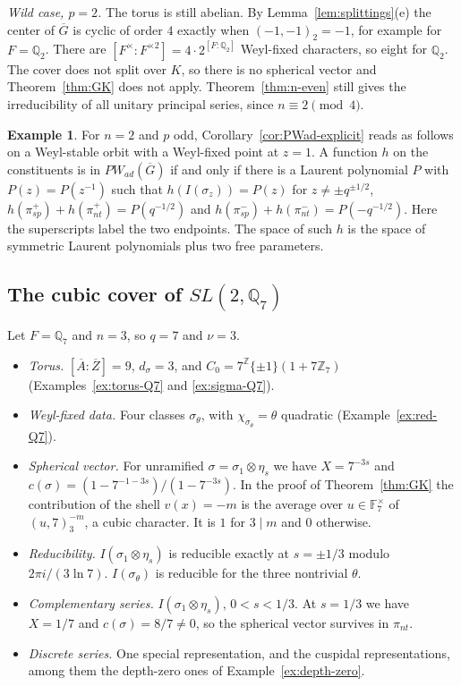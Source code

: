 \documentclass[12pt,letterpaper]{article}
\numberwithin{equation}{section}
\theoremstyle{definition}
\newtheorem{example}[theorem]{Example}
\newcommand{\Z}{\mathbb Z}
\newcommand{\Q}{\mathbb Q}
\newcommand{\bG}{\overline{G}}
\newcommand{\bA}{\overline{A}}
\newcommand{\bZ}{\overline{Z}}
\begin{document}
\emph{Wild case, $p=2$.}  The torus is still abelian.  By Lemma~\ref{lem:splittings}(e) the
center of $\bG$ is cyclic of order $4$ exactly when $(-1,-1)_2=-1$, for example for
$F=\Q_2$.  There are $[F^\times:F^{\times2}]=4\cdot2^{[F:\Q_2]}$ Weyl-fixed characters, so
eight for $\Q_2$.  The cover does not split over $K$, so there is no spherical vector and
Theorem~\ref{thm:GK} does not apply.  Theorem~\ref{thm:n-even} still gives the
irreducibility of all unitary principal series, since $n\equiv2\pmod4$.

\begin{example}\label{ex:PW-n2}
For $n=2$ and $p$ odd, Corollary~\ref{cor:PWad-explicit} reads as follows on a Weyl-stable
orbit with a Weyl-fixed point at $z=1$.  A function $h$ on the constituents is in
$PW_{ad}(\bG)$ if and only if there is a Laurent polynomial $P$ with $P(z)=P(z^{-1})$ such
that $h(I(\sigma_z))=P(z)$ for $z\ne\pm q^{\pm1/2}$,
$h(\pi_{sp}^+)+h(\pi_{nt}^+)=P(q^{-1/2})$ and $h(\pi_{sp}^-)+h(\pi_{nt}^-)=P(-q^{-1/2})$.
Here the superscripts label the two endpoints.  The space of such $h$ is the space of
symmetric Laurent polynomials plus two free parameters.
\end{example}

\subsection{\texorpdfstring{The cubic cover of $SL(2,\Q_7)$}{The cubic cover of SL(2,Q7)}}

Let $F=\Q_7$ and $n=3$, so $q=7$ and $\nu=3$.
\begin{itemize}[leftmargin=*,itemsep=1pt]
\item \emph{Torus.}  $[\bA:\bZ]=9$, $d_\sigma=3$, and $C_0=7^{\Z}\{\pm1\}(1+7\Z_7)$
(Examples~\ref{ex:torus-Q7} and \ref{ex:sigma-Q7}).
\item \emph{Weyl-fixed data.}  Four classes $\sigma_\theta$, with $\chi_{\sigma_\theta}=\theta$
quadratic (Example~\ref{ex:red-Q7}).
\item \emph{Spherical vector.}  For unramified $\sigma=\sigma_1\otimes\eta_s$ we have
$X=7^{-3s}$ and $c(\sigma)=(1-7^{-1-3s})/(1-7^{-3s})$.  In the proof of
Theorem~\ref{thm:GK} the contribution of the shell $v(x)=-m$ is the average over
$u\in\mathbb F_7^\times$ of $(u,7)_3^{-m}$, a cubic character.  It is $1$ for $3\mid m$ and
$0$ otherwise.
\item \emph{Reducibility.}  $I(\sigma_1\otimes\eta_s)$ is reducible exactly at $s=\pm1/3$
modulo $2\pi i/(3\ln7)$.  $I(\sigma_\theta)$ is reducible for the three nontrivial $\theta$.
\item \emph{Complementary series.}  $I(\sigma_1\otimes\eta_s)$, $0<s<1/3$.  At $s=1/3$ we
have $X=1/7$ and $c(\sigma)=8/7\ne0$, so the spherical vector survives in $\pi_{nt}$.
\item \emph{Discrete series.}  One special representation, and the cuspidal
representations, among them the depth-zero ones of Example~\ref{ex:depth-zero}.
\end{itemize}
\end{document}
